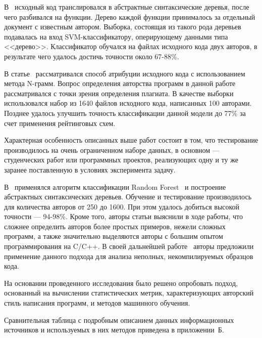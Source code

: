 В~\cite{pellin} исходный код транслировался в абстрактные синтаксические деревья, 
после чего разбивался на функции. Дерево каждой функции принималось за отдельный документ с известным автором. 
Выборка, состоящая из такого рода деревьев подавалась на вход SVM-классификатору, 
оперирующему данными типа <<дерево>>. Классификатор обучался на файлах исходного кода двух авторов, в результате чего удалось достичь точности около 67-88\%.

В статье~\cite{burrows} рассматривался способ атрибуции исходного кода с использованием метода N-грамм. 
Вопрос определения авторства программ в данной работе рассматривался с точки зрения определения плагиата. 
В качестве выборки использовался набор из 1640 файлов исходного кода, написанных 100 авторами. Позднее 
удалось улучшить точность классификации данной модели до 77\% за счет применения рейтинговых схем.~\cite{burrows_big}~\cite{burrows_3}

Характерная особенность описанных выше работ состоит в том, что тестирование производилось на очень 
ограниченном наборе данных, в основном --- студенческих работ или программных проектов, реализующих 
одну и ту же заранее поставленную в условиях эксперимента задачу.

В~\cite{caliskan} применялся алгоритм классификации Random Forest~\cite{random_forest} и построение 
абстрактных синтаксических деревьев. Обучение и тестирование производилось для 
количества авторов от 250 до 1600. При этом удалось добиться высокой точности --- 94-98\%. 
Кроме того, авторы статьи выяснили в ходе работы, что сложнее определить авторов более простых примеров, 
нежели сложных программ, а также значительно выделяются авторы с большим опытом программирования на C/C++. 
В своей дальнейшей работе~\cite{git_blame} авторы предложили применение данного подхода для анализа неполных, 
некомпилируемых образцов кода. 

На основании проведенного исследования было решено опробовать подход, основанный на вычислении 
статистических метрик, характеризующих авторский стиль написания программ, и методов машинного обучения. 

Сравнительная таблица с подробным описанием данных информационных источников и используемых в них методов 
приведена в приложении~Б.





